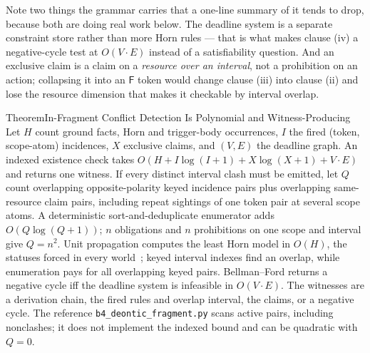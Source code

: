 \documentclass[11pt,a4paper]{article}
\theoremstyle{definition}
\theoremstyle{definition}
\theoremstyle{remark}
\begin{document}
\noindent Note two things the grammar carries that a one-line summary of it
tends to drop, because both are doing real work below. The deadline system is a
separate constraint store rather than more Horn rules --- that is what makes
clause (iv) a negative-cycle test at $O(V\cdot E)$ instead of a satisfiability
question. And an exclusive claim is a claim on a \emph{resource over an
interval}, not a prohibition on an action; collapsing it into an $\mathsf{F}$
token would change clause (iii) into clause (ii) and lose the resource
dimension that makes it checkable by interval overlap.

\begin{pdclaim}{Theorem}{In-Fragment Conflict Detection Is Polynomial and Witness-Producing}
\setlength{\parskip}{4pt plus 1pt}
\label{thm:deontic-detect}
Let $H$ count ground facts, Horn and trigger-body occurrences, $I$ the fired
(token, scope-atom) incidences, $X$ exclusive claims, and $(V,E)$ the deadline
graph. An indexed existence check takes
$O(H+I\log(I+1)+X\log(X+1)+V\cdot E)$ and returns one witness. If every
distinct interval clash must be emitted, let $Q$ count overlapping
opposite-polarity keyed incidence pairs plus overlapping same-resource claim
pairs, including repeat sightings of one token pair at several scope atoms.
A deterministic sort-and-deduplicate enumerator adds $O(Q\log(Q+1))$; $n$
obligations and $n$ prohibitions on one scope and interval give $Q=n^2$.
Unit propagation computes the least Horn model in $O(H)$, the statuses forced
in every world~; keyed interval indexes find an overlap, while
enumeration pays for all overlapping keyed pairs. Bellman--Ford returns a
negative cycle iff the deadline system is infeasible in $O(V\cdot E)$.
The witnesses are a derivation chain, the fired rules and overlap interval,
the claims, or a negative cycle. The reference
\texttt{b4\_deontic\_fragment.py} scans active pairs, including nonclashes;
it does not implement the indexed bound and can be quadratic with $Q=0$.
\end{pdclaim}
\end{document}
